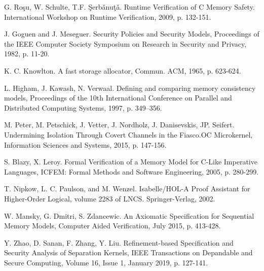 \documentclass[runningheads]{llncs}
\begin{document}
\begin{thebibliography}{8}
G. Ro\c{s}u, W. Schulte, T.F. \c{S}erb\v{a}nu\c{t}\v{a}. Runtime Verification of C Memory Safety. International Workshop on Runtime Verification, 2009, p. 132-151.

J. Goguen and J. Meseguer. Security Policies and Security Models, Proceedings of the IEEE Computer Society Symposium on Research in Security and Privacy, 1982, p. 11-20.

K. C. Knowlton. A fast storage allocator, Commun. ACM, 1965, p. 623-624.

L. Higham, J. Kawash, N. Verwaal. Defining and comparing memory consistency
models, Proceedings of the 10th International Conference on Parallel and Distributed Computing Systems, 1997, p. 349–356.

M. Peter, M. Petschick, J. Vetter, J. Nordholz, J. Danisevskis, JP. Seifert. Undermining Isolation Through Covert Channels in the Fiasco.OC Microkernel, Information Sciences and Systems, 2015, p. 147-156.

S. Blazy, X. Leroy. Formal Verification of a Memory Model for C-Like Imperative Languages, ICFEM: Formal Methods and Software Engineering, 2005, p. 280-299.

T. Nipkow, L. C. Paulson, and M. Wenzel. Isabelle/HOL-A Proof Assistant for Higher-Order Logical, volume 2283 of LNCS. Springer-Verlag, 2002.

W. Mansky, G. Dmitri, S. Zdancewic. An Axiomatic Specification for Sequential Memory Models, Computer Aided Verification, July 2015, p. 413-428.

Y. Zhao, D. Sanan, F. Zhang, Y. Liu. Refinement-based Specification and Security Analysis of Separation Kernels, IEEE Transactions on Depandable and Secure Computing, Volume 16, Issue 1, January 2019, p. 127-141.
\end{thebibliography}
\end{document}
